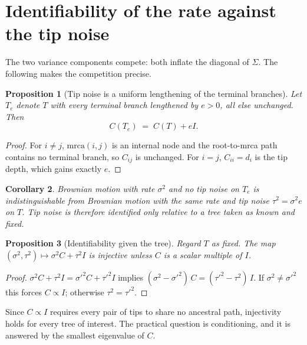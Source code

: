 \documentclass[11pt]{article}
\newtheorem{proposition}{Proposition}
\newtheorem{corollary}[proposition]{Corollary}
\theoremstyle{remark}
\begin{document}
\section{Identifiability of the rate against the tip noise}

The two variance components compete: both inflate the diagonal of $\Sigma$. The following makes the
competition precise.

\begin{proposition}[Tip noise is a uniform lengthening of the terminal branches]
\label{prop:degeneracy}
Let $T_e$ denote $T$ with every terminal branch lengthened by $e > 0$, all else unchanged. Then
\begin{equation}
  C(T_e) \;=\; C(T) + e I .
\end{equation}
\end{proposition}

\begin{proof}
For $i \neq j$, $\mathrm{mrca}(i,j)$ is an internal node and the root-to-mrca path contains no
terminal branch, so $C_{ij}$ is unchanged. For $i = j$, $C_{ii} = d_i$ is the tip depth, which gains
exactly $e$.
\end{proof}

\begin{corollary}
Brownian motion with rate $\sigma^2$ and no tip noise on $T_e$ is indistinguishable from Brownian
motion with the same rate and tip noise $\tau^2 = \sigma^2 e$ on $T$. Tip noise is therefore
identified only \emph{relative to a tree taken as known and fixed}.
\end{corollary}

\begin{proposition}[Identifiability given the tree]
\label{prop:ident}
Regard $T$ as fixed. The map $(\sigma^2,\tau^2) \mapsto \sigma^2 C + \tau^2 I$ is injective unless
$C$ is a scalar multiple of $I$.
\end{proposition}

\begin{proof}
$\sigma^2 C + \tau^2 I = \sigma'^2 C + \tau'^2 I$ implies
$(\sigma^2 - \sigma'^2)\,C = (\tau'^2 - \tau^2)\, I$. If $\sigma^2 \neq \sigma'^2$ this forces
$C \propto I$; otherwise $\tau^2 = \tau'^2$.
\end{proof}

Since $C \propto I$ requires every pair of tips to share no ancestral path, injectivity holds for
every tree of interest. The practical question is conditioning, and it is answered by the smallest
eigenvalue of $C$.
\end{document}
